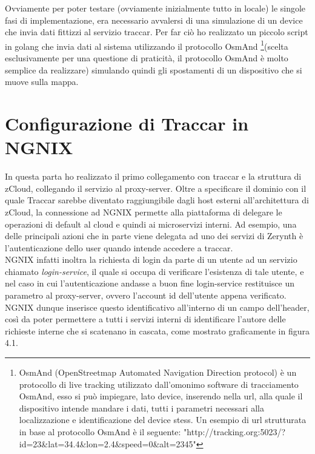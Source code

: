 \documentclass[a4paper,titlepage,12pt]{book}
\begin{document}
{Ovviamente per poter testare (ovviamente inizialmente tutto in locale) le singole fasi di implementazione, era necessario avvalersi di una simulazione di un device che invia dati fittizzi al servizio traccar. Per far ciò ho realizzato un piccolo script in golang che invia dati al sistema utilizzando il protocollo OsmAnd \footnote{OsmAnd (OpenStreetmap Automated Navigation Direction protocol) è un protocollo di live tracking utilizzato dall'omonimo software di tracciamento OsmAnd, esso si può impiegare, lato device, inserendo nella url, alla quale il dispositivo intende mandare i dati, tutti i parametri necessari alla localizzazione e identificazione del device stess. Un esempio di url strutturata in base al protocollo OsmAnd è il seguente: "http://tracking.org:5023/?id=23\&lat=34.4\&lon=2.4\&speed=0\&alt=2345"}(scelta esclusivamente per una questione di praticità, il protocollo OsmAnd è molto semplice da realizzare) simulando quindi gli spostamenti di un dispositivo che si muove sulla mappa.

\section{
Configurazione di Traccar in NGNIX}
In questa parta ho realizzato il primo collegamento con traccar e la struttura di zCloud, collegando il servizio al proxy-server. Oltre a specificare il dominio con il quale Traccar sarebbe diventato raggiungibile dagli host esterni all'architettura di zCloud, la connessione ad NGNIX permette alla piattaforma di delegare le operazioni di default al cloud e quindi ai microservizi interni. Ad esempio, una delle principali azioni che in parte viene delegata ad uno dei servizi di Zerynth è l'autenticazione dello user quando intende accedere a traccar. \\
NGNIX infatti inoltra la richiesta di login da parte di un utente ad un servizio chiamato \textit{login-service}, il quale si occupa di verificare l'esistenza di tale utente, e nel caso in cui l'autenticazione andasse a buon fine login-service restituisce un parametro al proxy-server, ovvero l'account id dell'utente appena verificato. NGNIX dunque inserisce questo identificativo all'interno di un campo dell'header, così da poter permettere a tutti i servizi interni di identificare l'autore delle richieste interne che si scatenano in cascata, come mostrato graficamente in figura 4.1.

}
\end{document}
